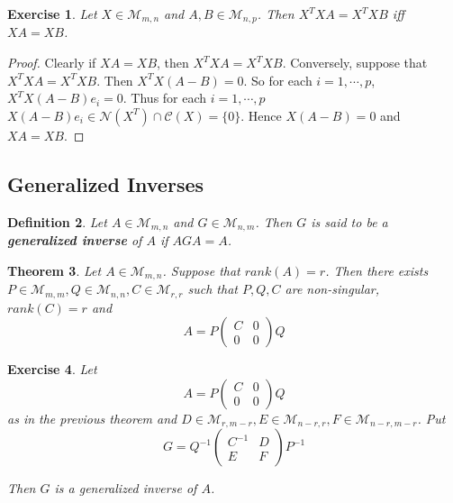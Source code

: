 \documentclass[12pt]{amsart}
\newtheorem{thm}{Theorem}[section]
\newtheorem{defn}[thm]{Definition}
\newtheorem{ex}[thm]{Exercise}
\newcommand{\MC}{\mathcal{C}}
\newcommand{\MN}{\mathcal{N}}
\newcommand{\MM}{\mathcal{M}}
\begin{document}
\begin{ex}
Let $X \in \MM_{m,n}$ and $A,B \in \MM_{n,p}$. Then $X^TXA = X^TXB$ iff $XA = XB$. 
\end{ex}

\begin{proof}
Clearly if $XA = XB$, then $X^TXA = X^TXB$. Conversely, suppose that $X^TXA = X^TXB$. Then $X^TX(A-B) = 0$. So for  each $i =1, \cdots, p$, $X^TX(A-B)e_i = 0$. Thus for each $i=1, \cdots, p$ $X(A-B)e_i \in \MN(X^T) \cap \MC(X) = \{0\}$. Hence $X(A-B) = 0$ and $XA = XB$. 
\end{proof}

\subsection{Generalized Inverses}

\begin{defn}
Let $A \in \MM_{m,n}$ and $G \in \MM_{n,m}$. Then $G$ is said to be a \textbf{generalized inverse} of $A$ if $AGA = A$. 
\end{defn}

\begin{thm}
Let $A \in \MM_{m,n}$. Suppose that $rank(A) = r$. Then there exists $P \in \MM_{m,m}, Q \in \MM_{n,n}, C \in \MM_{r,r}$ such that $P,Q,C$ are non-singular, $rank(C) = r$ and 
\[
A = P
\begin{pmatrix}
C & 0 \\
0 & 0
\end{pmatrix}
Q
\]
\end{thm}

\begin{ex}
Let 
\[
A = P
\begin{pmatrix}
C & 0 \\
0 & 0
\end{pmatrix}
Q
\]
as in the previous theorem and $D \in \MM_{r,m-r}, E \in \MM_{n-r, r}, F \in \MM_{n-r, m-r}$. Put 
\[
G = Q^{-1}
\begin{pmatrix}
C^{-1} & D \\
E & F
\end{pmatrix}
P^{-1}
\]

Then $G$ is a generalized inverse of $A$.
 
\end{ex}
\end{document}
